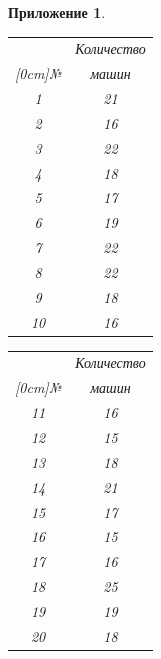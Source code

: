 \documentclass[12pt, a4paper]{extarticle}
\numberwithin{equation}{section}
\newtheorem{attachment}{\hspace{12cm}  Приложение}
\numberwithin{figure}{section}
\begin{document}
\begin{attachment}
\begin{table}[h!]
\begin{minipage}{0.23\linewidth}
		\centering
		\begin{tabular}{|c|c|}
			\hline
			 & Количество \\ 
			 \raisebox{1.5ex}[0cm]{№}
			 & машин 
			\\\hline
			1 & 21
			\\\hline
			2 & 16
			\\\hline
			3 & 22
			\\\hline
			4 & 18
			\\\hline
			5 & 17
			\\\hline
			6 & 19
			\\\hline
			7 & 22
			\\\hline
			8 & 22
			\\\hline
			9 & 18
			\\\hline
			10 & 16
			\\\hline
		\end{tabular}
	\end{minipage}
	\begin{minipage}{0.23\linewidth}
		\centering
		
		\begin{tabular}{|c|c|}
			\hline
			& Количество \\ 
			\raisebox{1.5ex}[0cm]{№}
			& машин  
			\\\hline
			11 & 16
			\\\hline
			12 & 15
			\\\hline
			13 & 18
			\\\hline
			14 & 21
			\\\hline
			15 & 17
			\\\hline
			16 & 15
			\\\hline
			17 & 16
			\\\hline
			18 & 25
			\\\hline
			19 & 19
			\\\hline
			20 & 18
			\\\hline
		\end{tabular}
	\end{minipage} 
	\begin{minipage}{0.23\linewidth}
		\centering
	

\end{minipage}
\end{table}
\end{attachment}
\end{document}
